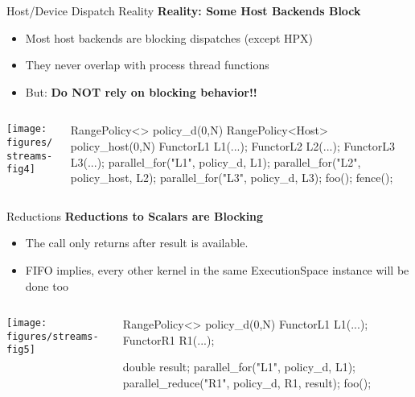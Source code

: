 \begin{frame}[fragile]{Host/Device Dispatch Reality}
  \textbf{Reality: Some Host Backends Block}
  \begin{itemize}
  \item{Most host backends are blocking dispatches (except HPX)}
    \item{They never overlap with process thread functions}
    \item{But: \textbf{Do NOT rely on blocking behavior!!}}
  \end{itemize}

  \begin{columns}[]
    \begin{column}{.67\textwidth}

       \texttt{[image: figures/streams-fig4]} 
 
    \end{column}

    \begin{column}{.33\textwidth}
	    \begin{code}[linebackgroundcolor={},keywords={L1,L2,L3,policy_device,policy_host}]
RangePolicy<> 
  policy_d(0,N)
RangePolicy<Host>
  policy_host(0,N)
FunctorL1 L1(...);
FunctorL2 L2(...);
FunctorL3 L3(...);
parallel_for("L1", 
  policy_d, L1);
parallel_for("L2", 
  policy_host, L2);
parallel_for("L3", 
  policy_d, L3);
foo();
fence();
      \end{code}
    \end{column}
  \end{columns}
\end{frame}


\begin{frame}[fragile]{Reductions}
  \textbf{Reductions to Scalars are Blocking}
  \begin{itemize}
    \item{The call only returns after result is available.}
    \item{FIFO implies, every other kernel in the same ExecutionSpace instance will be done too}
  \end{itemize}

  \begin{columns}[]
    \begin{column}{.67\textwidth}

       \texttt{[image: figures/streams-fig5]} 
 
    \end{column}

    \begin{column}{.33\textwidth}
	    \begin{code}[linebackgroundcolor={},keywords={L1,L2,policy_device}]
RangePolicy<> 
  policy_d(0,N)
FunctorL1 L1(...);
FunctorR1 R1(...);

double result;
parallel_for("L1", 
  policy_d, L1);
parallel_reduce("R1", 
  policy_d, R1, result);
foo();
      \end{code}
    \end{column}
  \end{columns}
\end{frame}

